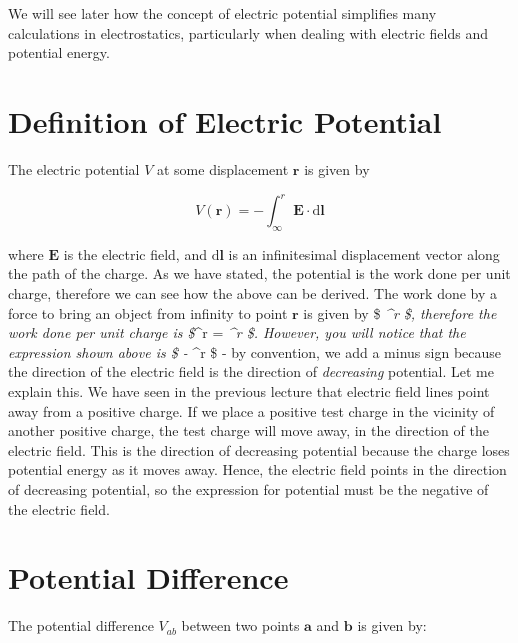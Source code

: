 \documentclass[
  letterpaper,
  DIV=11,
  numbers=noendperiod]{scrreprt}
\begin{document}
We will see later how the concept of electric potential simplifies many
calculations in electrostatics, particularly when dealing with electric
fields and potential energy.

\section{Definition of Electric
Potential}\label{definition-of-electric-potential}

The electric potential \(V\) at some displacement
\(\mathrm{\mathbf{r}}\) is given by

\[ V(\mathrm{\mathbf{r}}) = −\int_{\infty}^r \mathrm{\mathbf{E}}\cdot \mathrm{d}\mathrm{\mathbf{l}}\]

where \(\mathrm{\mathbf{E}}\) is the electric field, and
\(\mathrm{d}\mathrm{\mathbf{l}}\) is an infinitesimal displacement
vector along the path of the charge. As we have stated, the potential is
the work done per unit charge, therefore we can see how the above can be
derived. The work done by a force to bring an object from infinity to
point \(\mathrm{\mathbf{r}}\) is given by \$ \int\emph{\infty\^{}r
 \cdot {}\$, therefore the
work done per unit charge is \$\int}\infty\^{}r
 \cdot {} =
\int\emph{\infty\^{}r
 \cdot {} \$. However, you
will notice that the expression shown above is \$ - \int}\infty\^{}r
 \cdot {} \$ - by
convention, we add a minus sign because the direction of the electric
field is the direction of \emph{decreasing} potential. Let me explain
this. We have seen in the previous lecture that electric field lines
point away from a positive charge. If we place a positive test charge in
the vicinity of another positive charge, the test charge will move away,
in the direction of the electric field. This is the direction of
decreasing potential because the charge loses potential energy as it
moves away. Hence, the electric field points in the direction of
decreasing potential, so the expression for potential must be the
negative of the electric field.

\section{Potential Difference}\label{potential-difference}

The potential difference \(V_{ab}\) between two points
\(\mathrm{\mathbf{a}}\) and \(\mathrm{\mathbf{b}}\) is given by:
\end{document}
